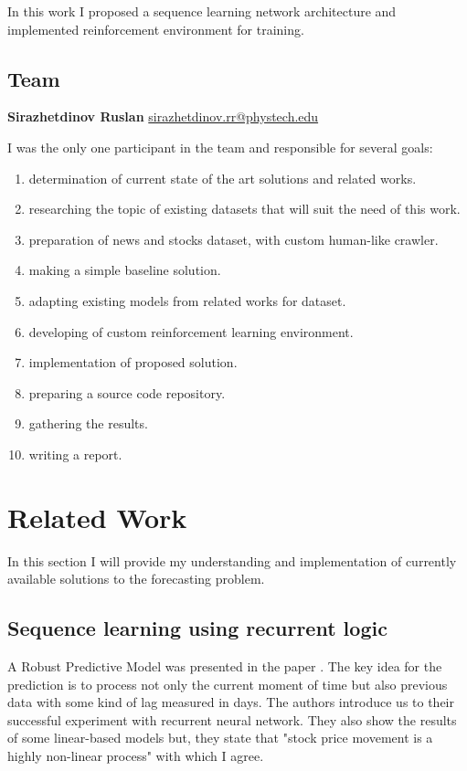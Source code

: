 \documentclass{article}
\begin{document}
In this work I proposed a sequence learning network architecture and implemented reinforcement environment for training.

\subsection{Team}
\textbf{Sirazhetdinov Ruslan} \href{mailto:sirazhetdinov.rr@phystech.edu}{sirazhetdinov.rr@phystech.edu}

I was the only one participant in the team and responsible for several goals:

\begin{enumerate}
  \item  determination of current state of the art solutions and related works.
  \item  researching the topic of existing datasets that will suit the need of this work.
  \item  preparation of news and stocks dataset, with custom human-like crawler.
  \item  making a simple baseline solution.
  \item  adapting existing models from related works for dataset.
  \item  developing of custom reinforcement learning environment.
  \item  implementation of proposed solution.
  \item  preparing a source code repository.
  \item  gathering the results.
  \item  writing a report.

\end{enumerate}


\section{Related Work}
\label{sec:related}

In this section I will provide my understanding and implementation of currently available solutions to the forecasting problem.

\subsection{Sequence learning using recurrent logic}
A Robust Predictive Model was presented in the paper \cite{Sen_2021}.
The key idea for the prediction is to process not only the current moment of time but also previous data with some kind of lag measured in days.
The authors introduce us to their successful experiment with recurrent neural network. They also show the results of some linear-based models but, they state that "stock price movement is a highly non-linear process" with which I agree.
\end{document}
